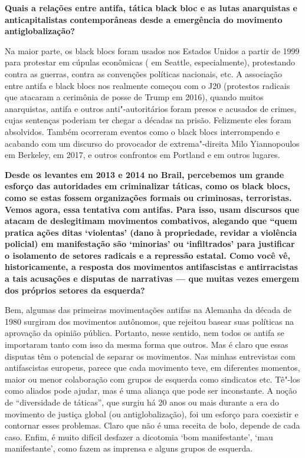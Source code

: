 \textbf{Quais a relações entre antifa, tática black bloc e as lutas anarquistas e anticapitalistas contemporâneas desde a emergência do movimento antiglobalização?}
 
Na maior parte, os black blocs foram usados nos Estados Unidos a partir de 1999 para protestar em cúpulas econômicas ( em Seattle, especialmente), protestando contra as guerras, contra as convenções políticas nacionais, etc. A associação entre antifa e black blocs nos  realmente começou com o J20 (protestos radicais que atacaram a cerimônia de posse de Trump em 2016), quando muitos anarquistas, antifa e outros anti"-autoritários foram presos e acusados de crimes, cujas sentenças poderiam ter chegar a décadas na prisão. Felizmente eles foram absolvidos. Também ocorreram eventos como o black blocs interrompendo e acabando com um discurso do provocador de extrema"-direita Milo Yiannopoulos em Berkeley, em 2017, e outros confrontos em Portland e em outros lugares. 

\textbf{Desde os levantes em 2013 e 2014 no Brail, percebemos um grande esforço das autoridades em criminalizar táticas, como os black blocs, como se estas fossem organizações formais ou criminosas, terroristas. Vemos agora, essa tentativa com antifas. Para isso, usam discursos que atacam de deslegitimam movimentos combativos, alegando que ``quem pratica ações ditas `violentas' (dano à propriedade, revidar a violência policial) em manifestação são `minorias' ou `infiltrados' para justificar o isolamento de setores radicais e a repressão estatal. Como você vê, historicamente, a resposta dos movimentos antifascistas e antirracistas a tais acusações e disputas de narrativas --- que muitas vezes emergem dos próprios setores da esquerda?}
 
Bem, algumas das primeiras movimentações antifas na Alemanha da década de 1980 surgiram dos movimentos autônomos, que rejeitou basear suas políticas na aprovação da opinião pública. Portanto, nesse sentido, nem todos os antifa se importaram tanto com isso da mesma forma que outros. Mas é claro que essas disputas têm o potencial de separar os movimentos. Nas minhas entrevistas com antifascistas europeus, parece que cada movimento teve, em diferentes momentos, maior ou menor colaboração com grupos de esquerda como sindicatos etc. Tê"-los como aliados pode ajudar, mas é uma aliança que  pode ser inconstante. A noção de ``diversidade de táticas'', que surgiu há 20 anos ou mais durante a era do movimento  de justiça global (ou antiglobalização), foi um esforço para coexistir e contornar esses problemas. Claro que não é uma receita de bolo, depende de cada caso. Enfim, é muito difícil desfazer a dicotomia `bom manifestante', `mau manifestante', como fazem as imprensa e alguns grupos de esquerda. 
 
